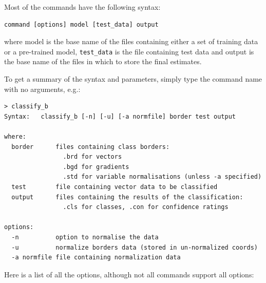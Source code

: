 \documentclass[12pt]{article}
\begin{document}
\label{COMMAND_PARAMETERS}

Most of the commands have the following syntax:

\begin{verbatim}
command [options] model [test_data] output
\end{verbatim}

where model is the base name of the files containing either a set of training data or a pre-trained model, \verb/test_data/ is the file containing test data and output is the base name of the files in which to store the final estimates.

To get a summary of the syntax and parameters, simply type the command name with no arguments, e.g.:

\begin{verbatim}
> classify_b
Syntax:   classify_b [-n] [-u] [-a normfile] border test output

where:
  border      files containing class borders:
                .brd for vectors
                .bgd for gradients
                .std for variable normalisations (unless -a specified)
  test        file containing vector data to be classified
  output      files containing the results of the classification:
                .cls for classes, .con for confidence ratings

options:
  -n          option to normalise the data
  -u          normalize borders data (stored in un-normalized coords)
  -a normfile file containing normalization data
\end{verbatim}

Here is a list of all the options, although not all commands support all options:
\end{document}
